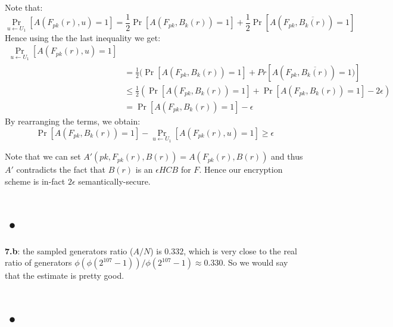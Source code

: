\documentclass{article}
\begin{document}
Note that:
\[\Pr_{u \leftarrow U_1}[A(F_{pk}(r), u) =1] = \frac{1}{2}\Pr[A(F_{pk}, B_k(r)) = 1]  + \frac{1}{2}\Pr[A(F_{pk}, \overline{B_k(r)}) = 1]\]
Hence using the the last inequality we get:
\begin{align*}
\Pr_{u \leftarrow U_1}[A(F_{pk}(r), u) =1] &\\
&= \frac{1}{2}(\Pr[A(F_{pk}, B_k(r)) = 1]  + Pr[A(F_{pk}, \overline{B_k(r)}) = 1)]\\
 &\leq\frac{1}{2}(\Pr[A(F_{pk}, B_k(r)) = 1] + \Pr[A(F_{pk}, B_k(r)) = 1] - 2\epsilon ) \\
 &= \Pr[A(F_{pk}, B_k(r)) = 1] - \epsilon
\end{align*}
By rearranging the terms, we obtain:
 \[\Pr[A(F_{pk}, B_k(r)) = 1] - \Pr_{u \leftarrow U_1}[A(F_{pk}(r), u) =1] \geq \epsilon\]

Note that we can set $A'(pk, F_{pk}(r), B(r)) = A(F_{pk}(r), B(r)) $ and thus $A'$ contradicts the fact that $B(r)$ is an $\epsilon HCB$ for $F$.
Hence our encryption scheme is in-fact $2\epsilon$ semantically-secure.

\section{•}


\textbf{7.b}: the sampled generators ratio ($A / N$) is $0.332$, which is very close to the real ratio of generators $\phi(\phi(2^{107}-1)) / \phi(2^{107}-1) \approx 0.330$. So we would say that the estimate is pretty good.

\pagebreak
\section{•}


\end{document}
